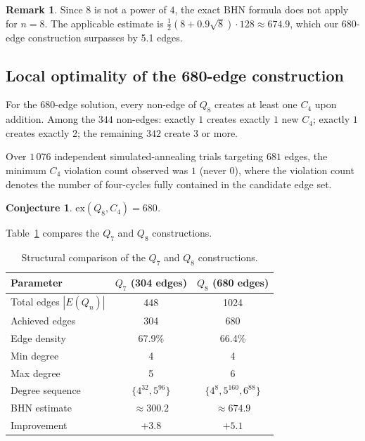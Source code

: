 \documentclass[12pt,a4paper]{article}
\newtheorem{conjecture}[theorem]{Conjecture}
\theoremstyle{definition}
\newtheorem{remark}[theorem]{Remark}
\newcommand{\ex}{\mathrm{ex}}
\begin{document}
\begin{remark}
Since $8$ is not a power of $4$, the exact BHN formula does not apply for
$n=8$.  The applicable estimate is
$\tfrac{1}{2}(8+0.9\sqrt{8})\cdot128\approx674.9$,
which our 680-edge construction surpasses by 5.1 edges.
\end{remark}

\subsection{Local optimality of the 680-edge construction}

For the $680$-edge solution, every non-edge of $Q_8$ creates at least
one $C_4$ upon addition.  Among the $344$ non-edges:
exactly $1$ creates exactly $1$ new $C_4$; exactly $1$ creates exactly $2$;
the remaining $342$ create $3$ or more.

Over $1\,076$ independent simulated-annealing trials targeting $681$ edges,
the minimum $C_4$ violation count observed was $1$ (never $0$),
where the violation count denotes the number of four-cycles fully contained
in the candidate edge set.

\begin{conjecture}\label{conj:q8}
$\ex(Q_8,C_4)=680$.
\end{conjecture}

Table~\ref{tab:compare} compares the $Q_7$ and $Q_8$ constructions.

\begin{table}[ht]
\centering
\caption{Structural comparison of the $Q_7$ and $Q_8$ constructions.}
\label{tab:compare}\medskip
\begin{tabular}{lcc}
\toprule
Parameter & $Q_7$ (304 edges) & $Q_8$ (680 edges)\\
\midrule
Total edges $|E(Q_n)|$ & 448 & 1024\\
Achieved edges & 304 & 680\\
Edge density & 67.9\% & 66.4\%\\
Min degree & 4 & 4\\
Max degree & 5 & 6\\
Degree sequence & $\{4^{32},5^{96}\}$ & $\{4^8,5^{160},6^{88}\}$\\
BHN estimate & $\approx300.2$ & $\approx674.9$\\
Improvement & $+3.8$ & $+5.1$\\
\bottomrule
\end{tabular}
\end{table}

\end{document}
